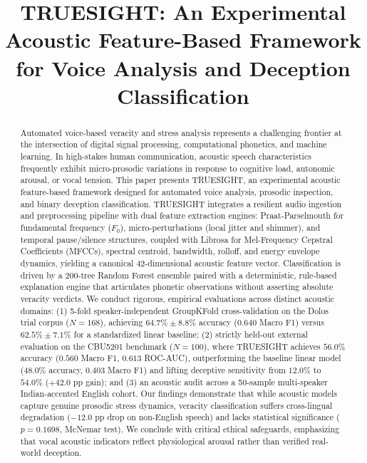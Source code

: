 \documentclass[conference]{IEEEtran}
\begin{document}
\title{TRUESIGHT: An Experimental Acoustic Feature-Based Framework for Voice Analysis and Deception Classification}

\author{
}

\maketitle

\begin{abstract}
Automated voice-based veracity and stress analysis represents a challenging frontier at the intersection of digital signal processing, computational phonetics, and machine learning. In high-stakes human communication, acoustic speech characteristics frequently exhibit micro-prosodic variations in response to cognitive load, autonomic arousal, or vocal tension. This paper presents TRUESIGHT, an experimental acoustic feature-based framework designed for automated voice analysis, prosodic inspection, and binary deception classification. TRUESIGHT integrates a resilient audio ingestion and preprocessing pipeline with dual feature extraction engines: Praat-Parselmouth for fundamental frequency ($F_0$), micro-perturbations (local jitter and shimmer), and temporal pause/silence structures, coupled with Librosa for Mel-Frequency Cepstral Coefficients (MFCCs), spectral centroid, bandwidth, rolloff, and energy envelope dynamics, yielding a canonical 42-dimensional acoustic feature vector. Classification is driven by a 200-tree Random Forest ensemble paired with a deterministic, rule-based explanation engine that articulates phonetic observations without asserting absolute veracity verdicts. We conduct rigorous, empirical evaluations across distinct acoustic domains: (1) 5-fold speaker-independent GroupKFold cross-validation on the Dolos trial corpus ($N=168$), achieving $64.7\% \pm 8.8\%$ accuracy ($0.640$ Macro F1) versus $62.5\% \pm 7.1\%$ for a standardized linear baseline; (2) strictly held-out external evaluation on the CBU5201 benchmark ($N=100$), where TRUESIGHT achieves $56.0\%$ accuracy ($0.560$ Macro F1, $0.613$ ROC-AUC), outperforming the baseline linear model ($48.0\%$ accuracy, $0.403$ Macro F1) and lifting deceptive sensitivity from $12.0\%$ to $54.0\%$ ($+42.0$ pp gain); and (3) an acoustic audit across a 50-sample multi-speaker Indian-accented English cohort. Our findings demonstrate that while acoustic models capture genuine prosodic stress dynamics, veracity classification suffers cross-lingual degradation ($-12.0$ pp drop on non-English speech) and lacks statistical significance ($p = 0.1698$, McNemar test). We conclude with critical ethical safeguards, emphasizing that vocal acoustic indicators reflect physiological arousal rather than verified real-world deception.
\end{abstract}
\end{document}
